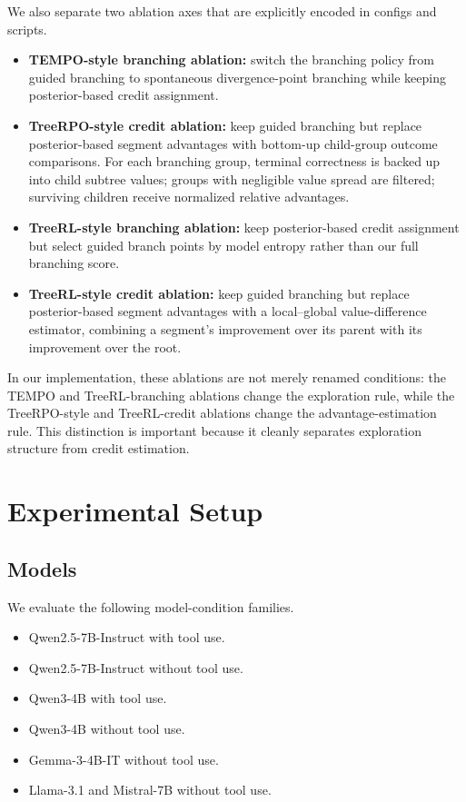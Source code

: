 \documentclass{article}
\begin{document}
We also separate two ablation axes that are explicitly encoded in configs and scripts.
\begin{itemize}
    \item \textbf{TEMPO-style branching ablation:} switch the branching policy from guided branching to spontaneous divergence-point branching while keeping posterior-based credit assignment.
    \item \textbf{TreeRPO-style credit ablation:} keep guided branching but replace posterior-based segment advantages with bottom-up child-group outcome comparisons. For each branching group, terminal correctness is backed up into child subtree values; groups with negligible value spread are filtered; surviving children receive normalized relative advantages.
    \item \textbf{TreeRL-style branching ablation:} keep posterior-based credit assignment but select guided branch points by model entropy rather than our full branching score.
    \item \textbf{TreeRL-style credit ablation:} keep guided branching but replace posterior-based segment advantages with a local--global value-difference estimator, combining a segment's improvement over its parent with its improvement over the root.
\end{itemize}

In our implementation, these ablations are not merely renamed conditions: the TEMPO and TreeRL-branching ablations change the exploration rule, while the TreeRPO-style and TreeRL-credit ablations change the advantage-estimation rule. This distinction is important because it cleanly separates exploration structure from credit estimation.

\section{Experimental Setup}
\subsection{Models}
We evaluate the following model-condition families.
\begin{itemize}
    \item Qwen2.5-7B-Instruct with tool use.
    \item Qwen2.5-7B-Instruct without tool use.
    \item Qwen3-4B with tool use.
    \item Qwen3-4B without tool use.
    \item Gemma-3-4B-IT without tool use.
    \item Llama-3.1 and Mistral-7B without tool use.
\end{itemize}
\end{document}
